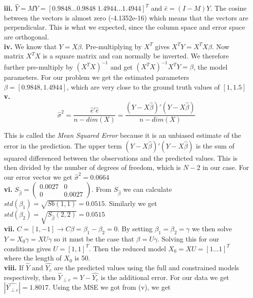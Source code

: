 \documentclass[12pt,a4paper,oneside]{report}
\begin{document}
                 
\textbf{iii.} $\hat{Y} = MY = [ 0.9848 \dots 0.9848 \; 1.4944 \dots 1.4944]^T$ and $\hat{e} = (I-M)Y$. The cosine between the vectors is almost zero (-4.1352e-16) which means that the vectors are perpendicular. This is what we expected, since the column space and error space are orthogonal.\\

\textbf{iv.} We know that $Y = X\beta$. Pre-multiplying by $X^T$ gives $X^TY = X^TX\beta$. Now matrix $X^TX$ is a square matrix and can normally be inverted. We therefore further pre-multiply by $(X^TX)^{-1}$ and get $(X^TX)^{-1}X^TY = \beta$, the model parameters. For our problem we get the estimated parameters $\beta = [0.9848, 1.4944]$, which are very close to the ground truth values of $[1, 1.5]$\\

\textbf{v.} $$\hat{\sigma}^2 = \frac{\hat{e}'\hat{e}}{n - dim(X)} = \frac{(Y - X\hat{\beta})'(Y - X\hat{\beta})}{n - dim(X)}$$

This is called the \emph{Mean Squared Error} because it is an unbiased estimate of the error in the prediction. The upper term $(Y - X\hat{\beta})'(Y - X\hat{\beta})$ is the sum of squared differenced between the observations and the predicted values. This is then divided by the number of degrees of freedom, which is $N - 2$ in our case. For our error vector we get $\hat{\sigma}^2 = 0.0664$\\

\textbf{vi.} $S_{\hat{\beta}} = \begin{pmatrix}
0.0027 & 0\\
0 & 0.0027
\end{pmatrix}$. From $S_{\hat{\beta}}$ we can calculate $std(\beta_1) = \sqrt{Sb(1,1)} = 0.0515$. Similarly we get  $std(\beta_2) = \sqrt{S_{\hat{\beta}}(2,2)} = 0.0515$\\

\textbf{vii.} $C = [1, -1] \to C\beta = \beta_1 - \beta_2 = 0$. By setting $\beta_1 = \beta_2 = \gamma$ we then solve $Y = X_0\gamma = XU\gamma$ so it must be the case that $\beta = U\gamma$. Solving this for our conditions gives $U = [1, 1]^T$. Then the reduced model $X_0 = XU = [1 \dots 1]^T $ where the length of $X_0$ is 50. \\


\textbf{viii.} If $\hat{Y}$ and $\hat{Y_c}$ are the predicted values using the full and constrained models respectively, then $\hat{Y}_{\perp c} = \hat{Y} - \hat{Y_c}$ is the additional error. For our data we get $|\hat{Y_{\perp c}}| = 1.8017$. Using the MSE we got from (v), we get 
\end{document}
